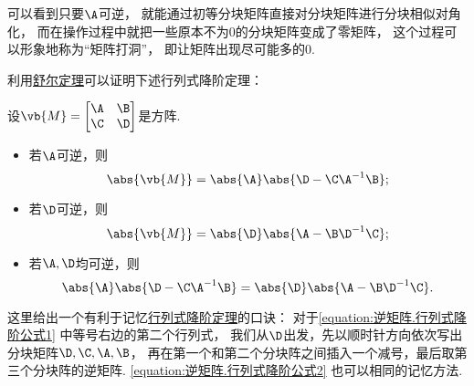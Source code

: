 可以看到只要\(\A\)可逆，
就能通过初等分块矩阵直接对分块矩阵进行分块相似对角化，
而在操作过程中就把一些原本不为0的分块矩阵变成了零矩阵，
这个过程可以形象地称为“矩阵打洞”，
即让矩阵出现尽可能多的0.

利用\hyperref[theorem:逆矩阵.舒尔定理]{舒尔定理}可以证明下述行列式降阶定理：
\begin{theorem}[行列式降阶定理]\label{theorem:逆矩阵.行列式降阶定理}
\def\M{\vb{M}}
设\(\M = \begin{bmatrix}
	\A & \B \\
	\C & \D
\end{bmatrix}\)是方阵.
\begin{itemize}
	\item 若\(\A\)可逆，则\begin{equation}\label{equation:逆矩阵.行列式降阶公式1}
		\abs{\M} = \abs{\A} \abs{\D - \C \A^{-1} \B};
	\end{equation}

	\item 若\(\D\)可逆，则\begin{equation}\label{equation:逆矩阵.行列式降阶公式2}
		\abs{\M} = \abs{\D} \abs{\A - \B \D^{-1} \C};
	\end{equation}

	\item 若\(\A,\D\)均可逆，则\begin{equation}
		\abs{\A} \abs{\D - \C \A^{-1} \B}
		= \abs{\D} \abs{\A - \B \D^{-1} \C}.
	\end{equation}
\end{itemize}
\end{theorem}
\begin{remark}
这里给出一个有利于记忆\hyperref[theorem:逆矩阵.行列式降阶定理]{行列式降阶定理}的口诀：
对于\cref{equation:逆矩阵.行列式降阶公式1} 中等号右边的第二个行列式，
我们从\(\D\)出发，先以顺时针方向依次写出分块矩阵\(\D,\C,\A,\B\)，
再在第一个和第二个分块阵之间插入一个减号，最后取第三个分块阵的逆矩阵.
\cref{equation:逆矩阵.行列式降阶公式2} 也可以相同的记忆方法.
\end{remark}

